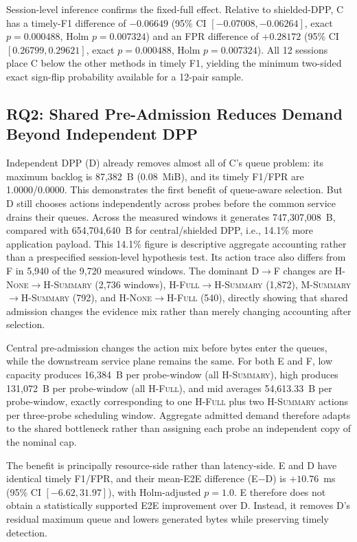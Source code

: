 \documentclass[10pt,journal]{IEEEtran}
\newcommand{\Msummary}{\textsc{M-Summary}}
\newcommand{\Hnone}{\textsc{H-None}}
\newcommand{\Hsummary}{\textsc{H-Summary}}
\newcommand{\Hfull}{\textsc{H-Full}}
\begin{document}
Session-level inference confirms the fixed-full effect. Relative to shielded-DPP, C has a timely-F1 difference of $-0.06649$ (95\% CI $[-0.07008,-0.06264]$, exact $p=0.000488$, Holm $p=0.007324$) and an FPR difference of $+0.28172$ (95\% CI $[0.26799,0.29621]$, exact $p=0.000488$, Holm $p=0.007324$). All 12 sessions place C below the other methods in timely F1, yielding the minimum two-sided exact sign-flip probability available for a 12-pair sample.

\subsection{RQ2: Shared Pre-Admission Reduces Demand Beyond Independent DPP}
Independent DPP (D) already removes almost all of C's queue problem: its maximum backlog is 87,382~B (0.08~MiB), and its timely F1/FPR are 1.0000/0.0000. This demonstrates the first benefit of queue-aware selection. But D still chooses actions independently across probes before the common service drains their queues. Across the measured windows it generates 747,307,008~B, compared with 654,704,640~B for central/shielded DPP, i.e., 14.1\% more application payload. This 14.1\% figure is descriptive aggregate accounting rather than a prespecified session-level hypothesis test. Its action trace also differs from F in 5,940 of the 9,720 measured windows. The dominant D$\rightarrow$F changes are \Hnone$\rightarrow$\Hsummary{} (2,736 windows), \Hfull$\rightarrow$\Hsummary{} (1,872), \Msummary$\rightarrow$\Hsummary{} (792), and \Hnone$\rightarrow$\Hfull{} (540), directly showing that shared admission changes the evidence mix rather than merely changing accounting after selection.

Central pre-admission changes the action mix before bytes enter the queues, while the downstream service plane remains the same. For both E and F, low capacity produces 16,384~B per probe-window (all \Hsummary), high produces 131,072~B per probe-window (all \Hfull), and mid averages 54,613.33~B per probe-window, exactly corresponding to one \Hfull{} plus two \Hsummary{} actions per three-probe scheduling window. Aggregate admitted demand therefore adapts to the shared bottleneck rather than assigning each probe an independent copy of the nominal cap.

The benefit is principally resource-side rather than latency-side. E and D have identical timely F1/FPR, and their mean-E2E difference (E$-$D) is $+10.76$~ms (95\% CI $[-6.62,31.97]$), with Holm-adjusted $p=1.0$. E therefore does not obtain a statistically supported E2E improvement over D. Instead, it removes D's residual maximum queue and lowers generated bytes while preserving timely detection.
\end{document}

